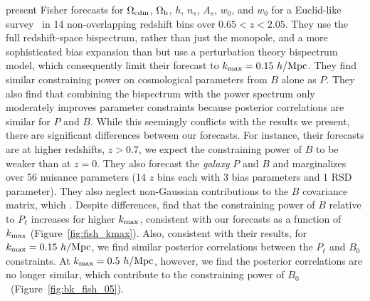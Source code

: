 \cite{yankelevich2019} present Fisher forecasts for $\Omega_{\rm cdm}$, 
$\Omega_{\rm b}$, $h$, $n_s$, $A_s$, $w_0$, and $w_0$ for a 
Euclid-like survey~\citep{laureijs2011} in 14 non-overlapping redshift 
bins over $0.65 < z < 2.05$. They use the full redshift-space bispectrum,
rather than just the monopole, and a more sophisticated bias expansion 
than \cite{sefusatti2006} but use a perturbation theory bispectrum model, 
which consequently limit their forecast to $k_{\rm max} = 0.15~h/{\rm Mpc}$. 
They find similar constraining power on cosmological parameters from $B$ 
alone as $P$. They also find that combining the bispectrum with the power 
spectrum only moderately improves parameter constraints because posterior 
correlations are similar for $P$ and $B$. While this seemingly conflicts 
with the results we present, there are significant differences between our 
forecasts. For instance, their forecasts are at higher redshifts, $z > 0.7$,
we expect the constraining power of $B$ to be weaker than at $z=0$. 
They also forecast the {\em galaxy} $P$ and $B$ and marginalizes over 
56 nuisance parameters (14 $z$ bins each with 3 bias parameters and 1 
RSD parameter). They also neglect non-Gaussian contributions to the $B$ 
covariance matrix, which 
.  %
Despite differences, \cite{yankelevich2019} find that the constraining 
power of $B$ relative to $P_\ell$ increases for higher $k_{\rm max}$, consistent 
with our forecasts as a function of $k_{\rm max}$ (Figure~\ref{fig:fish_kmax}). 
Also, consistent with their results, for $k_{\rm max} = 0.15~h/{\rm Mpc}$, 
we find similar posterior correlations between the $P_\ell$ and $B_0$ 
constraints. At $k_{\rm max} = 0.5~h/{\rm Mpc}$, however, we find the posterior 
correlations are no longer similar, which contribute to the constraining
power of $B_0$~(Figure~\ref{fig:bk_fish_05}).


